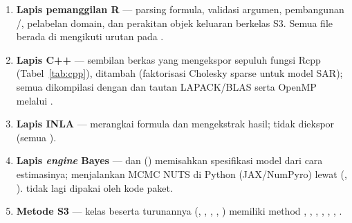 \begin{enumerate}[label=\arabic*.]
  \item \textbf{Lapis pemanggilan R} — parsing formula, validasi argumen,
        pembangunan /, pelabelan domain,
        dan perakitan objek keluaran berkelas S3. Semua file berada di
         mengikuti urutan  pada .
  \item \textbf{Lapis C++} — sembilan berkas  yang mengekspor
        sepuluh fungsi Rcpp (Tabel~\ref{tab:cpp}), ditambah 
        (faktorisasi Cholesky sparse untuk model SAR); semua dikompilasi dengan
         dan tautan LAPACK/BLAS serta OpenMP melalui
        .
  \item \textbf{Lapis INLA} —  merangkai formula
         dan mengekstrak hasil; tidak diekspor (semua
        ).
  \item \textbf{Lapis \emph{engine} Bayes} —  dan
         () memisahkan spesifikasi model dari
        cara estimasinya;  menjalankan MCMC NUTS di Python
        (JAX/NumPyro) lewat  (,
        ).  tidak lagi dipakai oleh kode paket.
  \item \textbf{Metode S3} — kelas  beserta turunannya
        (, , ,
        , ) memiliki method
        , , , ,
        , , .
\end{enumerate}

